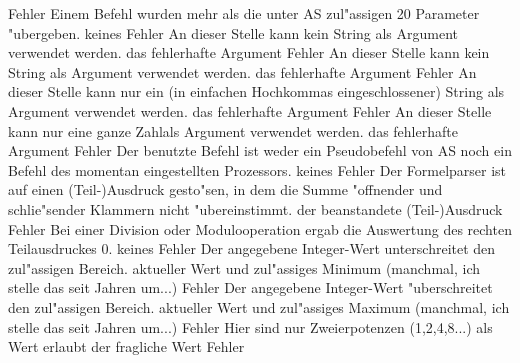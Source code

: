 \documentclass[12pt,a4paper,twoside]{report}
\begin{document}
\begin{description}
               {Fehler}
               {Einem Befehl wurden mehr als die unter AS
                zul"assigen 20 Parameter "ubergeben.}
               {keines}
               {Fehler}
               {An dieser Stelle kann kein String als Argument
                verwendet werden.}
               {das fehlerhafte Argument}
               {Fehler}
               {An dieser Stelle kann kein String als Argument
                verwendet werden.}
               {das fehlerhafte Argument}
               {Fehler}
               {An dieser Stelle kann nur ein (in einfachen Hochkommas
                eingeschlossener) String als Argument verwendet werden.}
               {das fehlerhafte Argument}
               {Fehler}
               {An dieser Stelle kann nur eine ganze Zahlals Argument
                verwendet werden.}
               {das fehlerhafte Argument}
               {Fehler}
               {Der benutzte Befehl ist weder ein Pseudobefehl
                von AS noch ein Befehl des momentan eingestellten
                Prozessors.}
               {keines}
               {Fehler}
               {Der Formelparser ist auf einen (Teil-)Ausdruck
                gesto"sen, in dem die Summe "offnender und schlie"sender
                Klammern nicht "ubereinstimmt.}
               {der beanstandete (Teil-)Ausdruck}
               {Fehler}
               {Bei einer Division oder Modulooperation ergab
                die Auswertung des rechten Teilausdruckes 0.}
               {keines}
               {Fehler}
               {Der angegebene Integer-Wert unterschreitet
                den zul"assigen Bereich.}
               {aktueller Wert und zul"assiges Minimum
	        (manchmal, ich stelle das seit Jahren um...)}
               {Fehler}
               {Der angegebene Integer-Wert "uberschreitet
                den zul"assigen Bereich.}
               {aktueller Wert und zul"assiges Maximum
	        (manchmal, ich stelle das seit Jahren um...)}
               {Fehler}
               {Hier sind nur Zweierpotenzen (1,2,4,8...)
                als Wert erlaubt}
               {der fragliche Wert}
               {Fehler}

\end{description}
\end{document}
